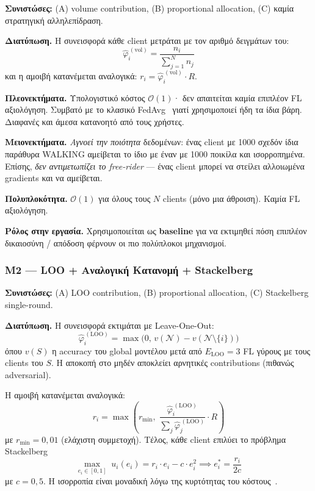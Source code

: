 \textbf{Συνιστώσες:} (A) volume contribution, (B) proportional allocation, (C) καμία στρατηγική αλληλεπίδραση.

\textbf{Διατύπωση.} Η συνεισφορά κάθε client μετράται με τον αριθμό δειγμάτων του:
\begin{equation}
    \hat{\varphi}_i^{\,(\text{vol})} = \frac{n_i}{\sum_{j=1}^{N} n_j}
    \label{eq:M1_contrib}
\end{equation}
και η αμοιβή κατανέμεται αναλογικά: $r_i = \hat{\varphi}_i^{\,(\text{vol})} \cdot R$.

\textbf{Πλεονεκτήματα.} Υπολογιστικό κόστος $\mathcal{O}(1)$· δεν απαιτείται καμία επιπλέον FL
αξιολόγηση. Συμβατό με το κλασικό FedAvg~\cite{McMahan2017} γιατί χρησιμοποιεί ήδη τα ίδια βάρη.
Διαφανές και άμεσα κατανοητό από τους χρήστες.

\textbf{Μειονεκτήματα.} \emph{Αγνοεί την ποιότητα} δεδομένων: ένας client με 1000 σχεδόν ίδια
παράθυρα WALKING αμείβεται το ίδιο με έναν με 1000 ποικίλα και ισορροπημένα. Επίσης, \emph{δεν
αντιμετωπίζει το free-rider} — ένας client μπορεί να στείλει αλλοιωμένα gradients και να αμείβεται.

\textbf{Πολυπλοκότητα.} $\mathcal{O}(1)$ για όλους τους $N$ clients (μόνο μια άθροιση). Καμία FL
αξιολόγηση.

\textbf{Ρόλος στην εργασία.} Χρησιμοποιείται ως \textbf{baseline} για να εκτιμηθεί πόση επιπλέον
δικαιοσύνη / απόδοση φέρνουν οι πιο πολύπλοκοι μηχανισμοί.

\subsubsection{M2 — LOO + Αναλογική Κατανομή + Stackelberg}
\label{subsubsec:M2_loo_stackelberg}

\textbf{Συνιστώσες:} (A) LOO contribution, (B) proportional allocation, (C) Stackelberg single-round.

\textbf{Διατύπωση.} Η συνεισφορά εκτιμάται με Leave-One-Out:
\begin{equation}
    \hat{\varphi}_i^{\,(\text{LOO})} = \max\big(0,\, v(\mathcal{N}) - v(\mathcal{N} \setminus \{i\})\big)
    \label{eq:M2_loo}
\end{equation}
όπου $v(S)$ η accuracy του global μοντέλου μετά από $E_{\text{LOO}} = 3$ FL γύρους με τους clients
του $S$. Η αποκοπή στο μηδέν αποκλείει αρνητικές contributions (πιθανώς adversarial).

Η αμοιβή κατανέμεται αναλογικά:
\begin{equation}
    r_i = \max\!\left(r_{\min},\; \frac{\hat{\varphi}_i^{\,(\text{LOO})}}{\sum_{j} \hat{\varphi}_j^{\,(\text{LOO})}} \cdot R\right)
    \label{eq:M2_reward}
\end{equation}
με $r_{\min} = 0{,}01$ (ελάχιστη συμμετοχή). Τέλος, κάθε client επιλύει το πρόβλημα Stackelberg
\begin{equation}
    \max_{e_i \in [0,1]} \; u_i(e_i) = r_i \cdot e_i - c \cdot e_i^2
    \implies e_i^* = \frac{r_i}{2c}
    \label{eq:M2_effort}
\end{equation}
με $c = 0{,}5$. Η ισορροπία είναι μοναδική λόγω της κυρτότητας του κόστους~\cite{Sarikaya2020}.

